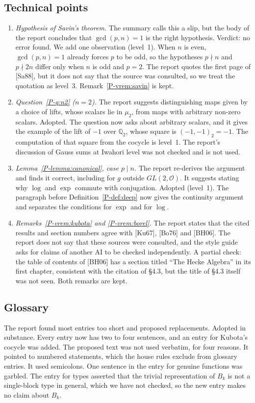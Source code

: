 \documentclass[12pt,letterpaper]{amsart}
\newcommand{\cO}{\mathcal{O}}
\begin{document}
\subsection*{Technical points}
\begin{enumerate}[leftmargin=1.5em]
\item \emph{Hypothesis of Savin's theorem.} The summary calls this a
slip, but the body of the report concludes that $\gcd(p,n)=1$ is the
right hypothesis. Verdict: no error found. We add one observation
(level~1). When $n$ is even, $\gcd(p,n)=1$ already forces $p$ to be
odd, so the hypotheses $p\nmid n$ and $p\nmid 2n$ differ only when $n$
is odd and $p=2$. The report quotes the first page of [Sa88], but it
does not say that the source was consulted, so we treat the quotation
as level~3. Remark~\ref{P-vrem:savin} is kept.
\item \emph{Question~\ref{P-q:n2} ($n=2$).} The report suggests
distinguishing maps given by a choice of lifts, whose scalars lie in
$\mu_2$, from maps with arbitrary non-zero scalars. Adopted. The
question now asks about arbitrary scalars, and it gives the example of
the lift of $-1$ over $\mathbb{Q}_2$, whose square is
$(-1,-1)_2=-1$. The computation of that square from the cocycle is
level~1. The report's discussion of Gauss sums at Iwahori level was not
checked and is not used.
\item \emph{Lemma~\ref{P-lemma:canonical}, case $p\mid n$.} The report
re-derives the argument and finds it correct, including for $g$ outside
$GL(2,\cO)$. It suggests stating why $\log$ and $\exp$ commute with
conjugation. Adopted (level~1). The paragraph before
Definition~\ref{P-def:deep} now gives the continuity argument and
separates the conditions for $\exp$ and for $\log$.
\item \emph{Remarks~\ref{P-vrem:kubota} and \ref{P-vrem:borel}.} The
report states that the cited results and section numbers agree with
[Ku67], [Bo76] and [BH06]. The report does not say that these sources
were consulted, and the style guide asks for claims of another AI to be
checked independently. A partial check: the table of contents of [BH06]
has a section titled ``The Hecke Algebra'' in its first chapter,
consistent with the citation of \S4.3, but the title of \S4.3 itself
was not seen. Both remarks are kept.
\end{enumerate}

\subsection*{Glossary}
The report found most entries too short and proposed replacements.
Adopted in substance. Every entry now has two to four sentences, and an
entry for Kubota's cocycle was added. The proposed text was not used
verbatim, for four reasons. It pointed to numbered statements, which
the house rules exclude from glossary entries. It used semicolons. One
sentence in the entry for genuine functions was garbled. The entry for
types asserted that the trivial representation of $B_k$ is not a
single-block type in general, which we have not checked, so the new
entry makes no claim about $B_k$.
\end{document}
